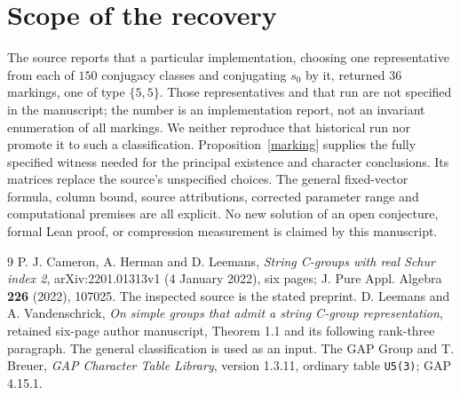 \documentclass[11pt,a4paper]{article}
\begin{document}
\section{Scope of the recovery}
The source reports that a particular implementation, choosing one
representative from each of $150$ conjugacy classes and conjugating
$s_0$ by it, returned $36$ markings, one of type $\{5,5\}$. Those
representatives and that run are not specified in the manuscript;
the number is an implementation report, not an invariant enumeration
of all markings. We neither reproduce that historical run nor promote
it to such a classification. Proposition~\ref{marking} supplies the
fully specified witness needed for the principal existence and
character conclusions. Its matrices replace the source's unspecified
choices. The general fixed-vector formula, column bound, source
attributions, corrected parameter range and computational premises
are all explicit. No new solution of an open conjecture, formal Lean
proof, or compression measurement is claimed by this manuscript.

\begin{thebibliography}{9}
 P. J. Cameron, A. Herman and D. Leemans,
\emph{String C-groups with real Schur index 2},
arXiv:2201.01313v1 (4 January 2022), six pages;
J. Pure Appl. Algebra \textbf{226} (2022), 107025.
The inspected source is the stated preprint.
 D. Leemans and A. Vandenschrick,
\emph{On simple groups that admit a string C-group representation},
retained six-page author manuscript, Theorem 1.1 and its following
rank-three paragraph. The general classification is used as an input.
 The GAP Group and T. Breuer,
\emph{GAP Character Table Library}, version 1.3.11,
ordinary table \texttt{U5(3)}; GAP 4.15.1.
\end{thebibliography}
\end{document}

